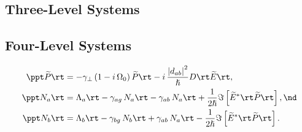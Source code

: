  \subsection{Three-Level Systems\label{sct:laser_gain_med_hls}}

 \subsection{Four-Level Systems\label{sct:laser_gain_med_fls}}

 \begin{subequations} \label{eqn:fls_mbe_rwa}
 \begin{align}
\label{eqn:fls_mbe_rwa_pol} \ppt \widetilde{P}\rt &= -\gamma_\perp \left( 1 - i\, \Omega_0 \right) \widetilde{P}\rt - i\, \frac{\left|d_{a b}\right|^2}{\hslash} D\rt \widetilde{E}\rt , \\
\label{eqn:fls_mbe_rwa_pop_a} \ppt N_a\rt &= \Lambda_a\rt - \gamma_{a g}\, N_a\rt - \gamma_{a b}\, N_a\rt + \frac{1}{2 \hslash} \Im \left[ \widetilde{E}^\ast\rt \widetilde{P}\rt \right] , \nd \\
\label{eqn:fls_mbe_rwa_pop_b} \ppt N_b\rt &= \Lambda_b\rt - \gamma_{b g}\, N_b\rt + \gamma_{a b}\, N_a\rt - \frac{1}{2 \hslash} \Im \left[ \widetilde{E}^\ast\rt \widetilde{P}\rt \right] .
 \end{align}
 \end{subequations}

